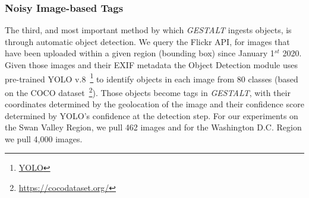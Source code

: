 


\subsubsection{Noisy Image-based Tags}
The third, and most important method by which \emph{GESTALT} ingests objects, is through automatic object detection.
We query the Flickr API, for images that have been uploaded within a given region (bounding box) since January 1$^{st}$ 2020. 
Given those images and their EXIF metadata the Object Detection module uses pre-trained YOLO v.8~\footnote{\href{https://github.com/ultralytics/ultralytics}{YOLO}} to identify objects in each image from 80 classes (based on the COCO dataset~\footnote{\href{{https://cocodataset.org/}}{https://cocodataset.org/}}). 
Those objects become tags in \emph{GESTALT}, with their coordinates determined by the geolocation of the image and their confidence score determined by YOLO's confidence at the detection step.
For our experiments on the Swan Valley Region, we pull 462 images and for the Washington D.C. Region we pull 4,000 images. 






